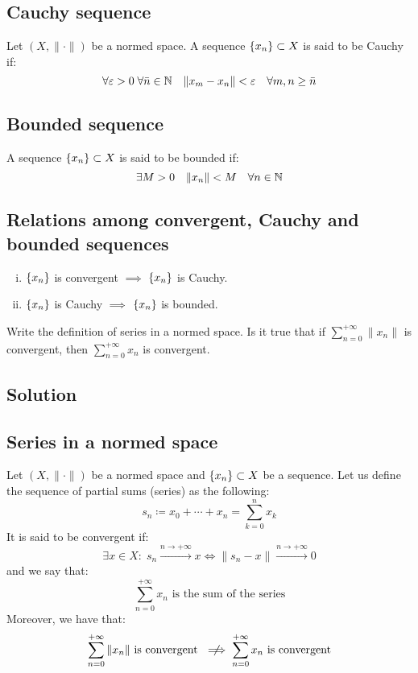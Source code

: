\subsection{Cauchy sequence}
Let $(X, \| \cdot \|)$ be a normed space. A sequence $\{ x_n \} \subset X$ is said to be Cauchy if:
\[ \forall \varepsilon > 0 \; \forall \bar{n} \in \mathbb{N} \quad \| x_m - x_n \| < \varepsilon \quad \forall m,n \geq \bar{n} \]

\subsection{Bounded sequence}
A sequence $\{ x_n \} \subset X$ is said to be bounded if:
\[ \exists M>0 \quad \|x_n\| < M \quad \forall n \in \mathbb{N} \]

\subsection{Relations among convergent, Cauchy and bounded sequences}
\begin{enumerate}[i)]
    \item $\{ x_n \}$ is convergent $\implies$ $\{ x_n \}$ is Cauchy.
    \item $\{ x_n \}$ is Cauchy $\implies$ $\{ x_n \}$ is bounded.
\end{enumerate}


\question
Write the definition of series in a normed space. Is it true that if $\sum^{+\infty}_{n=0} \|x_n\|$ is convergent, then $\sum^{+\infty}_{n=0} x_n$ is convergent.

\subsection*{Solution}

\subsection{Series in a normed space}
Let $(X, \| \cdot \|)$ be a normed space and $\{ x_n \} \subset X$ be a sequence. Let us define the sequence of partial sums (series) as the following:
\[ s_n \coloneqq x_0 + \cdots + x_n = \sum_{k=0}^n x_k \]
It is said to be convergent if:
\[ \exists x \in X : \; s_n \xrightarrow{n \to +\infty} x \iff \| s_n - x \| \xrightarrow{n \to +\infty} 0 \]
and we say that:
\[ \sum^{+\infty}_{n=0} x_n \text{ is the sum of the series} \]
Moreover, we have that:
\[ \sum^{+\infty}_{n=0} \|x_n\| \text{ is convergent } \centernot\implies \sum^{+\infty}_{n=0} x_n \text{ is convergent} \]

